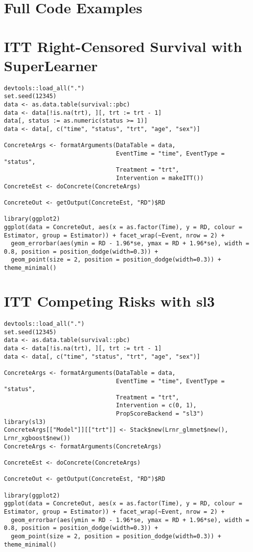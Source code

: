 \documentclass{report}
\newcommand{\1}{\ensuremath{\mathbf{1}}}
\begin{document}
\section{Full Code Examples}
\label{sec:orgf1980ac}
\section{ITT Right-Censored Survival with SuperLearner}
\begin{lstlisting}
devtools::load_all(".")
set.seed(12345)
data <- as.data.table(survival::pbc)
data <- data[!is.na(trt), ][, trt := trt - 1]
data[, status := as.numeric(status >= 1)]
data <- data[, c("time", "status", "trt", "age", "sex")]

ConcreteArgs <- formatArguments(DataTable = data,
                                EventTime = "time", EventType = "status",
                                Treatment = "trt",
                                Intervention = makeITT())
ConcreteEst <- doConcrete(ConcreteArgs)

ConcreteOut <- getOutput(ConcreteEst, "RD")$RD

library(ggplot2)
ggplot(data = ConcreteOut, aes(x = as.factor(Time), y = RD, colour = Estimator, group = Estimator)) + facet_wrap(~Event, nrow = 2) + 
  geom_errorbar(aes(ymin = RD - 1.96*se, ymax = RD + 1.96*se), width = 0.8, position = position_dodge(width=0.3)) +
  geom_point(size = 2, position = position_dodge(width=0.3)) + theme_minimal()
\end{lstlisting}

\section{ITT Competing Risks with sl3}
\begin{lstlisting}
devtools::load_all(".")
set.seed(12345)
data <- as.data.table(survival::pbc)
data <- data[!is.na(trt), ][, trt := trt - 1]
data <- data[, c("time", "status", "trt", "age", "sex")]

ConcreteArgs <- formatArguments(DataTable = data,
                                EventTime = "time", EventType = "status",
                                Treatment = "trt",
                                Intervention = c(0, 1),
                                PropScoreBackend = "sl3")
library(sl3)
ConcreteArgs[["Model"]][["trt"]] <- Stack$new(Lrnr_glmnet$new(), Lrnr_xgboost$new())
ConcreteArgs <- formatArguments(ConcreteArgs)

ConcreteEst <- doConcrete(ConcreteArgs)

ConcreteOut <- getOutput(ConcreteEst, "RD")$RD

library(ggplot2)
ggplot(data = ConcreteOut, aes(x = as.factor(Time), y = RD, colour = Estimator, group = Estimator)) + facet_wrap(~Event, nrow = 2) + 
  geom_errorbar(aes(ymin = RD - 1.96*se, ymax = RD + 1.96*se), width = 0.8, position = position_dodge(width=0.3)) +
  geom_point(size = 2, position = position_dodge(width=0.3)) + theme_minimal()
\end{lstlisting}
\end{document}

